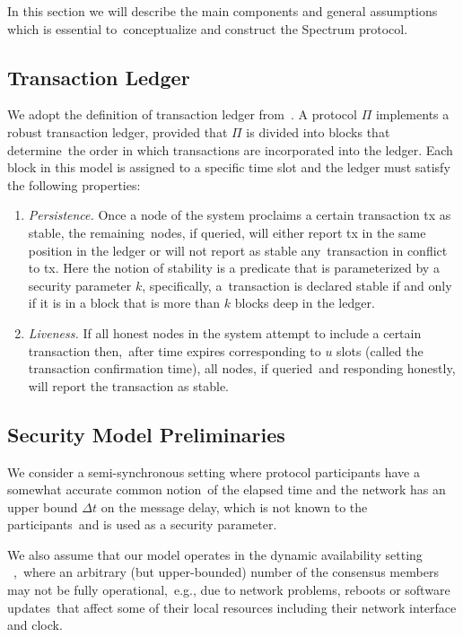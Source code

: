 In this section we will describe the main components and general assumptions which is essential to\
conceptualize and construct the Spectrum protocol.

\subsection{Transaction Ledger}\label{subsec:transaction-ledger.}
We adopt the definition of transaction ledger from~\cite{cryptoeprint:2016/889}.
A protocol $\Pi$ implements a robust transaction ledger, provided that $\Pi$ is divided into blocks that determine\
the order in which transactions are incorporated into the ledger.
Each block in this model is assigned to a specific time slot and the ledger must satisfy the following properties:
\begin{enumerate}
    \item \emph{Persistence.} Once a node of the system proclaims a certain transaction tx as stable, the remaining\
    nodes, if queried, will either report tx in the same position in the ledger or will not report as stable any\
    transaction in conflict to tx.
    Here the notion of stability is a predicate that is parameterized by a security parameter $k$, specifically, a\
    transaction is declared stable if and only if it is in a block that is more than $k$ blocks deep in the ledger.
    \item \emph{Liveness.} If all honest nodes in the system attempt to include a certain transaction then,\
    after time expires corresponding to $u$ slots (called the transaction confirmation time), all nodes, if queried\
    and responding honestly, will report the transaction as stable.
\end{enumerate}

\subsection{Security Model Preliminaries}\label{subsec:security-model-preliminaries.}
We consider a semi-synchronous setting where protocol participants have a somewhat accurate common notion\
of the elapsed time and the network has an upper bound ${\Delta t}$ on the message delay, which is not known to the participants\
and is used as a security parameter.

We also assume that our model operates in the dynamic availability setting ~\cite{Badertscher2018},\
where an arbitrary (but upper-bounded) number of the consensus members may not be fully operational,\
e.g., due to network problems, reboots or software updates\
that affect some of their local resources including their network interface and clock.

